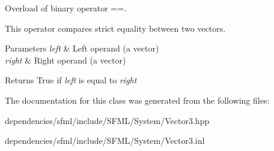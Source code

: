 Overload of binary operator ==. 

This operator compares strict equality between two vectors.


\begin{DoxyParams}{Parameters}
{\em left} & Left operand (a vector) \\
\hline
{\em right} & Right operand (a vector)\\
\hline
\end{DoxyParams}
\begin{DoxyReturn}{Returns}
True if {\itshape left} is equal to {\itshape right} 
\end{DoxyReturn}


The documentation for this class was generated from the following files\+:\begin{DoxyCompactItemize}
\item 
dependencies/sfml/include/\+S\+F\+M\+L/\+System/Vector3.\+hpp\item 
dependencies/sfml/include/\+S\+F\+M\+L/\+System/Vector3.\+inl\end{DoxyCompactItemize}
